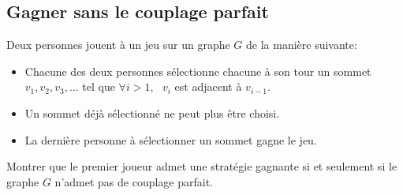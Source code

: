 
%
%
%
%
%
%
%
%


\subsection{Gagner sans le couplage parfait}
Deux personnes jouent à un jeu sur un graphe $G$ de la manière suivante: \\

\begin{itemize}
  \item Chacune des deux personnes sélectionne chacune à son tour un sommet $v_1, v_2, v_3, …$ tel que $\forall i > 1, \ \ \ v_i$ est adjacent à $v_{i-1}$.
  \item Un sommet déjà sélectionné ne peut plus être choisi.
  \item La dernière personne à sélectionner un sommet gagne le jeu.
\end{itemize}

Montrer que le premier joueur admet une stratégie gagnante si et seulement si le graphe $G$ n'admet pas de couplage parfait.
